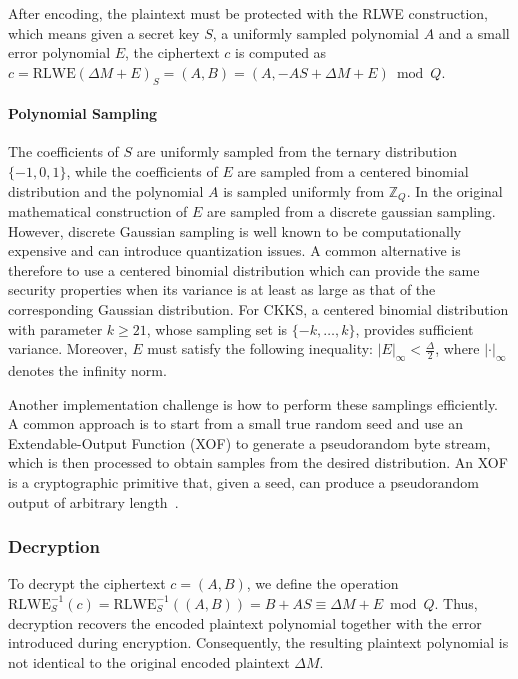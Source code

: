 After encoding, the plaintext must be protected with the RLWE construction, which means given a secret key $S$, a uniformly sampled polynomial $A$ and a small error polynomial $E$, the ciphertext $c$ is computed as $c = \text{RLWE}(\Delta M + E)_S = (A, B) =  (A, -AS + \Delta M + E) \bmod Q$.

\paragraph{Polynomial Sampling}

The coefficients of $S$ are uniformly sampled from the ternary distribution $\{-1,0,1\}$, while the coefficients of $E$ are sampled from a centered binomial distribution and the polynomial $A$ is sampled uniformly from $\mathbb{Z}_Q$. In the original mathematical construction of $E$ are sampled from a discrete gaussian sampling. However, discrete Gaussian sampling is well known to be computationally expensive and can introduce quantization issues. A common alternative is therefore to use a centered binomial distribution which can provide the same security properties when its variance is at least as large as that of the corresponding Gaussian distribution. For CKKS, a centered binomial distribution with parameter $k \geq 21$, whose sampling set is $\{-k,\ldots,k\}$, provides sufficient variance. Moreover, $E$ must satisfy the following inequality: $|E|_{\infty}<\frac{\Delta}{2}$, where $|\cdot|_{\infty}$ denotes the infinity norm.

Another implementation challenge is how to perform these samplings efficiently. A common approach is to start from a small true random seed and use an Extendable-Output Function (XOF) to generate a pseudorandom byte stream, which is then processed to obtain samples from the desired distribution. An XOF is a cryptographic primitive that, given a seed, can produce a pseudorandom output of arbitrary length~\cite{stallings2014network}.

\subsubsection{Decryption}
\label{ckks:decrypt}

To decrypt the ciphertext $c=(A,B)$, we define the operation $\text{RLWE}_S^{-1}(c) = \text{RLWE}_S^{-1}((A, B)) = B + AS \equiv \Delta M + E \bmod Q$. Thus, decryption recovers the encoded plaintext polynomial together with the error introduced during encryption. Consequently, the resulting plaintext polynomial is not identical to the original encoded plaintext $\Delta M$.

